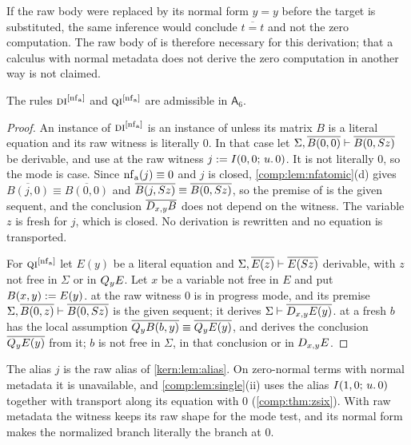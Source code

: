 If the raw body were replaced by its normal form $y=y$ before the target is
substituted, the same inference would conclude $\overline{t=t}$ and not the
zero computation. The raw body of  is therefore necessary for
this derivation; that a calculus with normal metadata does not derive the
zero computation in another way is not claimed.

\begin{lemma}
\label{comp:lem:asintro}
The rules $\rulename{DI}^{[\nf_{\mathrm a}]}$ and
$\rulename{QI}^{[\nf_{\mathrm a}]}$ are admissible in $\mathsf{A}_6$.
\end{lemma}

\begin{proof}
An instance of $\rulename{DI}^{[\nf_{\mathrm a}]}$ is an instance of
 unless its matrix $B$ is a literal equation and its raw witness
is literally $0$. In that case let
$\Sigma,\overline{B(0,0)}\vdash\overline{B(0,S z)}$ be derivable, and use
 at the raw witness $j\mathrel{:=}I(0,0;\,u.\,0)$. It is not
literally $0$, so the mode is case. Since $\operatorname{nf}_{\mathrm a}(j)\equiv0$ and $j$
is closed, \cref{comp:lem:nfatomic}(d) gives
$\overline{B(j,0)}\equiv\overline{B(0,0)}$ and
$\overline{B(j,S z)}\equiv\overline{B(0,S z)}$, so the premise of
 is the given sequent, and the conclusion
$\overline{D_{x,y}B}$ does not depend on the witness. The variable $z$ is
fresh for $j$, which is closed. No derivation is rewritten and no equation is
transported.

For $\rulename{QI}^{[\nf_{\mathrm a}]}$ let $E(y)$ be a literal equation and
$\Sigma,\overline{E(z)}\vdash\overline{E(S z)}$ derivable, with $z$ not
free in $\Sigma$ or in $Q_{y}E$. Let $x$ be a variable not free in $E$ and put
$B(x,y)\mathrel{:=} E(y)$.  at the raw witness $0$ is in progress mode,
and its premise $\Sigma,\overline{B(0,z)}\vdash\overline{B(0,S z)}$ is the
given sequent; it derives $\Sigma\vdash\overline{D_{x,y}E(y)}$.
 at a fresh $b$ has the local assumption
$\overline{Q_{y}B(b,y)}\equiv\overline{Q_{y}E(y)}$, and 
derives the conclusion $\overline{Q_{y}E(y)}$ from it; $b$ is not free in
$\Sigma$, in that conclusion or in $D_{x,y}E$.
\end{proof}

The alias $j$ is the raw alias of \cref{kern:lem:alias}. On zero-normal terms
with normal metadata it is unavailable, and \cref{comp:lem:single}(ii) uses
the alias $I(1,0;\,u.\,0)$ together with transport along its equation with
$0$ (\cref{comp:thm:zsix}). With raw metadata the witness keeps its raw shape
for the mode test, and its normal form makes the normalized branch literally
the branch at $0$.

